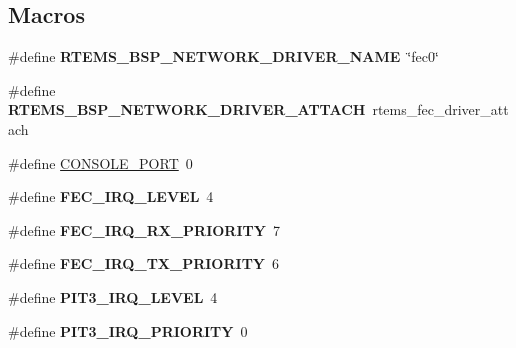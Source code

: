 \subsection*{Macros}
\begin{DoxyCompactItemize}
\item 
\mbox{\label{group__RTEMSBSPsM68kMCF5235_ga86d4f9aa98431100692e31068070a8df}} 
\#define {\bfseries R\+T\+E\+M\+S\+\_\+\+B\+S\+P\+\_\+\+N\+E\+T\+W\+O\+R\+K\+\_\+\+D\+R\+I\+V\+E\+R\+\_\+\+N\+A\+ME}~\char`\"{}fec0\char`\"{}
\item 
\mbox{\label{group__RTEMSBSPsM68kMCF5235_gadde0d66aef9442971dde465292ac14e6}} 
\#define {\bfseries R\+T\+E\+M\+S\+\_\+\+B\+S\+P\+\_\+\+N\+E\+T\+W\+O\+R\+K\+\_\+\+D\+R\+I\+V\+E\+R\+\_\+\+A\+T\+T\+A\+CH}~rtems\+\_\+fec\+\_\+driver\+\_\+attach
\item 
\#define \mbox{\hyperlink{group__RTEMSBSPsM68kMCF5235_ga0859abd84f64f7f09ad95a4079b06f41}{C\+O\+N\+S\+O\+L\+E\+\_\+\+P\+O\+RT}}~0
\item 
\mbox{\label{group__RTEMSBSPsM68kMCF5235_gad112ebc14ecfb90715c07100a7eadb07}} 
\#define {\bfseries F\+E\+C\+\_\+\+I\+R\+Q\+\_\+\+L\+E\+V\+EL}~4
\item 
\mbox{\label{group__RTEMSBSPsM68kMCF5235_gaf431aa7fcab6144223fd91d6fa311325}} 
\#define {\bfseries F\+E\+C\+\_\+\+I\+R\+Q\+\_\+\+R\+X\+\_\+\+P\+R\+I\+O\+R\+I\+TY}~7
\item 
\mbox{\label{group__RTEMSBSPsM68kMCF5235_gac8a869dff9e53d0cc40febabd696fe27}} 
\#define {\bfseries F\+E\+C\+\_\+\+I\+R\+Q\+\_\+\+T\+X\+\_\+\+P\+R\+I\+O\+R\+I\+TY}~6
\item 
\mbox{\label{group__RTEMSBSPsM68kMCF5235_ga70573852241aab02cc64e2c8745cd24f}} 
\#define {\bfseries P\+I\+T3\+\_\+\+I\+R\+Q\+\_\+\+L\+E\+V\+EL}~4
\item 
\mbox{\label{group__RTEMSBSPsM68kMCF5235_ga5aa390a01c2fd3849f575eeec819ac4a}} 
\#define {\bfseries P\+I\+T3\+\_\+\+I\+R\+Q\+\_\+\+P\+R\+I\+O\+R\+I\+TY}~0
\item 
\mbox{\label{group__RTEMSBSPsM68kMCF5235_ga3f6403d98a553ab7e5246ace59655611}} 

\end{DoxyCompactItemize}
